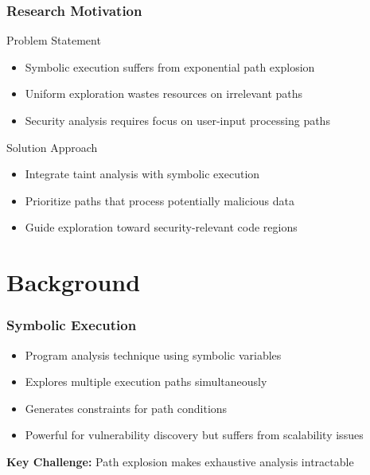 \documentclass[aspectratio=169]{beamer}
\begin{document}
\begin{frame}
    \frametitle{Research Motivation}
    \begin{research}{Problem Statement}
        \begin{itemize}
            \item Symbolic execution suffers from exponential path explosion
            \item Uniform exploration wastes resources on irrelevant paths
            \item Security analysis requires focus on user-input processing paths
        \end{itemize}
    \end{research}
    
    \begin{implementation}{Solution Approach}
        \begin{itemize}
            \item Integrate taint analysis with symbolic execution
            \item Prioritize paths that process potentially malicious data
            \item Guide exploration toward security-relevant code regions
        \end{itemize}
    \end{implementation}
\end{frame}

\section{Background}

\begin{frame}
    \frametitle{Symbolic Execution}
    \begin{itemize}
        \item Program analysis technique using symbolic variables
        \item Explores multiple execution paths simultaneously
        \item Generates constraints for path conditions
        \item Powerful for vulnerability discovery but suffers from scalability issues
    \end{itemize}
    
    \vspace{1em}
    \textbf{Key Challenge:} Path explosion makes exhaustive analysis intractable
\end{frame}
\end{document}
